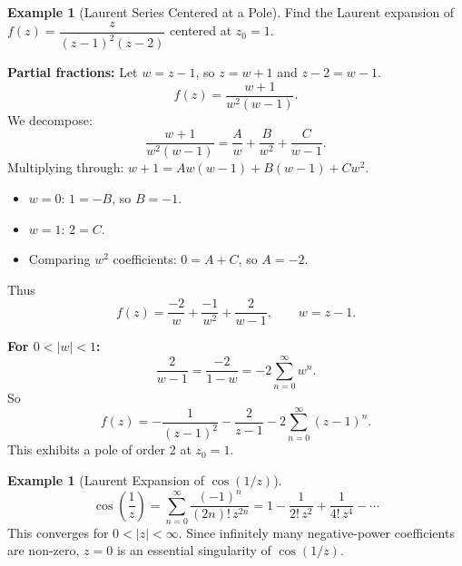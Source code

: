 \documentclass[12pt,a4paper,openany]{book}
\theoremstyle{definition}
\newtheorem{example}[definition]{Example}
\theoremstyle{plain}
\theoremstyle{remark}
\newcommand{\abs}[1]{\left|#1\right|}
\begin{document}
\begin{example}[Laurent Series Centered at a Pole]\label{ex:laurent-centered-pole}
Find the Laurent expansion of $f(z)=\dfrac{z}{(z-1)^2(z-2)}$ centered at $z_0=1$.

\medskip\noindent
\textbf{Partial fractions:} Let $w=z-1$, so $z=w+1$ and $z-2=w-1$.
\[
  f(z) = \frac{w+1}{w^2(w-1)}.
\]
We decompose:
\[
  \frac{w+1}{w^2(w-1)} = \frac{A}{w} + \frac{B}{w^2} + \frac{C}{w-1}.
\]
Multiplying through: $w+1 = Aw(w-1)+B(w-1)+Cw^2$.
\begin{itemize}
  \item $w=0$: $1=-B$, so $B=-1$.
  \item $w=1$: $2=C$.
  \item Comparing $w^2$ coefficients: $0=A+C$, so $A=-2$.
\end{itemize}
Thus
\[
  f(z) = \frac{-2}{w} + \frac{-1}{w^2} + \frac{2}{w-1}, \qquad w=z-1.
\]

\textbf{For $0<\abs{w}<1$:}
\[
  \frac{2}{w-1} = \frac{-2}{1-w} = -2\sum_{n=0}^{\infty}w^n.
\]
So
\[
  f(z) = -\frac{1}{(z-1)^2} - \frac{2}{z-1} - 2\sum_{n=0}^{\infty}(z-1)^n.
\]
This exhibits a pole of order 2 at $z_0=1$.
\end{example}

\begin{example}[Laurent Expansion of $\cos(1/z)$]\label{ex:laurent-cos}
\[
  \cos\left(\frac{1}{z}\right)
  = \sum_{n=0}^{\infty}\frac{(-1)^n}{(2n)!\,z^{2n}}
  = 1 - \frac{1}{2!\,z^2} + \frac{1}{4!\,z^4} - \cdots
\]
This converges for $0<\abs{z}<\infty$. Since infinitely many negative-power
coefficients are non-zero, $z=0$ is an essential singularity of $\cos(1/z)$.
\end{example}
\end{document}
